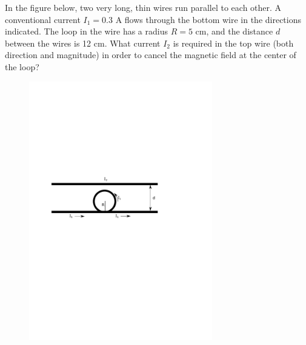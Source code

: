 \question In the figure below, two very long, thin wires run parallel to each other. A conventional current $I_1=0.3$ A flows through the bottom wire in the directions indicated. The loop in the wire has a radius $R=5$ cm, and the distance $d$ between the wires is 12 cm. What current $I_2$ is required in the top wire (both direction and magnitude) in order to cancel the magnetic field at the center of the loop?

\begin{figure}[ht!]
	\centering
	\includegraphics[width=8cm]{bfield_exam2.pdf}
\end{figure}